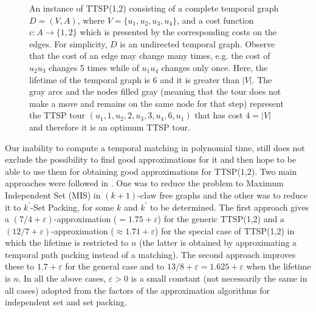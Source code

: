 \documentclass[oribibl, 11pt]{llncs}
\begin{document}
\begin{figure}[!hbtp]
\caption{An instance of TTSP(1,2) consisting of a complete temporal graph $D=(V,A)$, where $V=\{u_1,u_2,u_3,u_4\}$, and a cost function $c:A\rightarrow \{1,2\}$ which is presented by the corresponding costs on the edges. For simplicity, $D$ is an undirected temporal graph. Observe that the cost of an edge may change many times, e.g. the cost of $u_2u_3$ changes 5 times while of $u_1u_4$ changes only once. Here, the lifetime of the temporal graph is 6 and it is greater than $|V|$. The gray arcs and the nodes filled gray (meaning that the tour does not make a move and remains on the same node for that step) represent the TTSP tour $(u_1,1,u_2,2,u_3,3,u_4,6,u_1)$ that has cost $4=|V|$ and therefore it is an optimum TTSP tour.} \label{fig:tsp-example}
\end{figure}

Our inability to compute a temporal matching in polynomial time, still does not exclude the possibility to find good approximations for it and then hope to be able to use them for obtaining good approximations for TTSP(1,2). Two main approaches were followed in \cite{MS14}. One was to reduce the problem to {\sc Maximum Independent Set} ({\sc MIS}) in $(k+1)$-claw free graphs and the other was to reduce it to {\sc $k^\prime$-Set Packing}, for some $k$ and $k^\prime$ to be determined. The first approach gives a $(7/4+\varepsilon)$-approximation ($=1.75+\varepsilon$) for the generic TTSP(1,2) and a $(12/7+\varepsilon)$-approximation ($\approx 1.71+\varepsilon$) for the special case of TTSP(1,2) in which the lifetime is restricted to $n$ (the latter is obtained by approximating a temporal path packing instead of a matching). The second approach improves these to $1.7+\varepsilon$ for the general case and to $13/8+\varepsilon=1.625+\varepsilon$ when the lifetime is $n$. In all the above cases, $\varepsilon>0$ is a small constant (not necessarily the same in all cases) adopted from the factors of the approximation algorithms for independent set and set packing.
\end{document}
